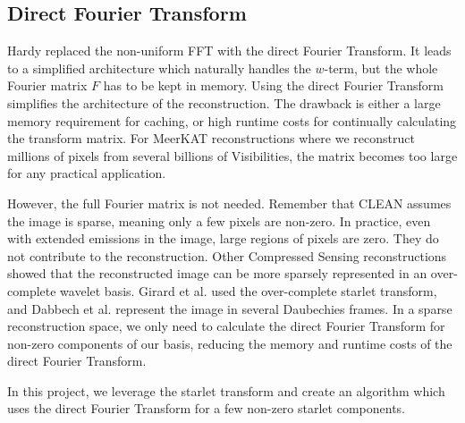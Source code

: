 \subsection{Direct Fourier Transform}
Hardy\cite{hardy2013direct} replaced the non-uniform FFT with the direct Fourier Transform. It leads to a simplified architecture which naturally handles the $w$-term, but the whole Fourier matrix $F$ has to be kept in memory. Using the direct Fourier Transform simplifies the architecture of the reconstruction. The drawback is either a large memory requirement for caching, or high runtime costs for continually calculating the transform matrix. For MeerKAT reconstructions where we reconstruct millions of pixels from several billions of Visibilities, the matrix becomes too large for any practical application.

However, the full Fourier matrix is not needed. Remember that CLEAN assumes the image is sparse, meaning only a few pixels are non-zero. In practice, even with extended emissions in the image, large regions of pixels are zero. They do not contribute to the reconstruction. Other Compressed Sensing reconstructions showed that the reconstructed image can be more sparsely represented in an over-complete wavelet basis. Girard et al.\cite{girard2015sparse} used the over-complete starlet transform, and Dabbech et al.\cite{dabbech2018cygnus} represent the image in several Daubechies frames. In a sparse reconstruction space, we only need to calculate the direct Fourier Transform for non-zero components of our basis, reducing the memory and runtime costs of the direct Fourier Transform.

In this project, we leverage the starlet transform and create an algorithm which uses the direct Fourier Transform for a few non-zero starlet components.